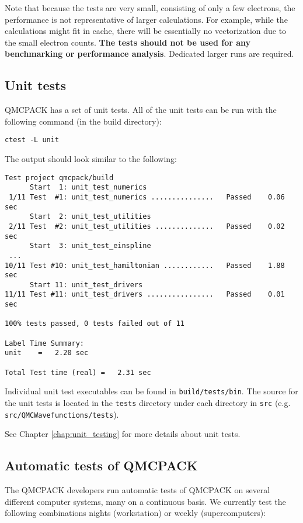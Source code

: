 Note that because the tests are very small, consisting of only a few
electrons, the performance is not representative of larger
calculations. For example, while the calculations might fit in cache,
there will be essentially no vectorization due to the small electron
counts. \textbf{The tests should not be used for any benchmarking or
performance analysis}. Dedicated larger runs are required.

\subsection{Unit tests}

QMCPACK has a set of unit tests.
All of the unit tests can be run with the following command (in the build directory):
\begin{verbatim}
ctest -L unit
\end{verbatim}

The output should look similar to the following:
\begin{verbatim}
Test project qmcpack/build
      Start  1: unit_test_numerics
 1/11 Test  #1: unit_test_numerics ...............   Passed    0.06 sec
      Start  2: unit_test_utilities
 2/11 Test  #2: unit_test_utilities ..............   Passed    0.02 sec
      Start  3: unit_test_einspline
 ...
10/11 Test #10: unit_test_hamiltonian ............   Passed    1.88 sec
      Start 11: unit_test_drivers
11/11 Test #11: unit_test_drivers ................   Passed    0.01 sec

100% tests passed, 0 tests failed out of 11

Label Time Summary:
unit    =   2.20 sec

Total Test time (real) =   2.31 sec
\end{verbatim}

Individual unit test executables can be found in \texttt{build/tests/bin}.
The source for the unit tests is located in the \texttt{tests} directory under each directory in \texttt{src} (e.g. \texttt{src/QMCWavefunctions/tests}).

See Chapter \ref{chap:unit_testing} for more details about unit tests.


\subsection{Automatic tests of QMCPACK}

The QMCPACK developers run automatic tests of QMCPACK on several
different computer systems,  many on a continuous basis. We currently test
the following combinations nights (workstation) or weekly (supercomputers):

